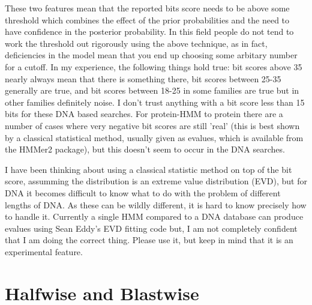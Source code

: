 \documentclass{article}
\begin{document}
These two features mean that the reported bits score needs to be above
some threshold which combines the effect of the prior probabilities
and the need to have confidence in the posterior probability. In this
field people do not tend to work the threshold out rigorously using
the above technique, as in fact, deficiencies in the model mean that
you end up choosing some arbitary number for a cutoff. In my
experience, the following things hold true: bit scores above 35 nearly
always mean that there is something there, bit scores between 25-35
generally are true, and bit scores between 18-25 in some families are
true but in other families definitely noise. I don't trust anything
with a bit score less than 15 bits for these DNA based searches. For
protein-HMM to protein there are a number of cases where very negative
bit scores are still 'real' (this is best shown by a classical
statistical method, usually given as evalues, which is available from
the HMMer2 package), but this doesn't seem to occur in the DNA
searches.

I have been thinking about using a classical statistic method on top
of the bit score, assumming the distribution is an extreme value
distribution (EVD), but for DNA it becomes difficult to know what to
do with the problem of different lengths of DNA. As these can be
wildly different, it is hard to know precisely how to handle
it. Currently a single HMM compared to a DNA database can produce
evalues using Sean Eddy's EVD fitting code but, I am not completely
confident that I am doing the correct thing.  Please use it, but keep
in mind that it is an experimental feature.

\newpage

\section{Halfwise and Blastwise}
\label{half_and_blast}
\end{document}
